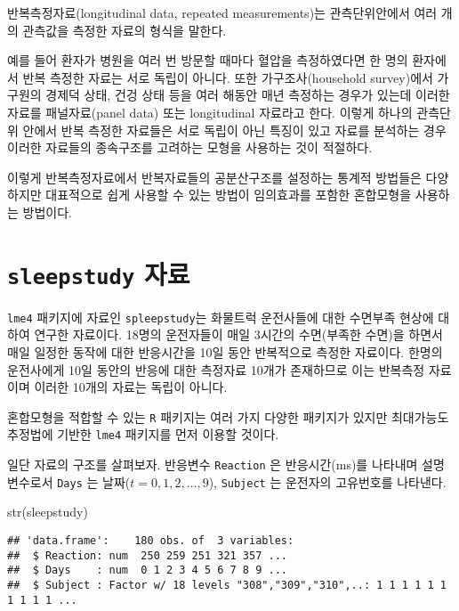\documentclass[
]{book}
\newenvironment{Shaded}{\begin{snugshade}}{\end{snugshade}}
\newcommand{\FunctionTok}[1]{\textcolor[rgb]{0.00,0.00,0.00}{#1}}
\newcommand{\NormalTok}[1]{#1}
\begin{document}
반복측정자료(longitudinal data, repeated measurements)는 관측단위안에서 여러 개의 관측값을 측정한 자료의 형식을 말한다.

예를 들어 환자가 병원을 여러 번 방문할 때마다 혈압을 측정하였다면 한 명의 환자에서 반복 측정한 자료는 서로 독립이 아니다. 또한 가구조사(household survey)에서 가구원의 경제덕 상태, 건겅 상태 등을 여러 해동안 매년 측정하는 경우가 있는데 이러한 자료를 패널자료(panel data) 또는 longitudinal 자료라고 한다. 이렇게 하나의 관측단위 안에서 반복 측정한 자료들은 서로 독립이 아닌 특징이 있고 자료를 분석하는 경우 이러한 자료들의 종속구조를 고려하는 모형을 사용하는 것이 적절하다.

이렇게 반복측정자료에서 반복자료들의 공분산구조를 설정하는 통계적 방법들은 다양하지만 대표적으로 쉽게 사용할 수 있는 방법이 임의효과를 포함한 혼합모형을 사용하는 방법이다.

\hypertarget{sleepstudy-uxc790uxb8cc}{%
\section{\texorpdfstring{\texttt{sleepstudy} 자료}{sleepstudy 자료}}\label{sleepstudy-uxc790uxb8cc}}

\texttt{lme4} 패키지에 자료인 \texttt{spleepstudy}는 화물트럭 운전사들에 대한 수면부족 현상에 대하여 연구한 자료이다. 18명의 운전자들이 매일 3시간의 수면(부족한 수면)을 하면서
매일 일정한 동작에 대한 반응시간을 10일 동안 반복적으로 측정한 자료이다.
한명의 운전사에게 10일 동안의 반응에 대한 측정자료 10개가 존재하므로 이는 반복측정 자료이며 이러한 10개의 자료는 독립이 아니다.

혼합모형을 적합할 수 있는 \texttt{R} 패키지는 여러 가지 다양한 패키지가 있지만 최대가능도 추정법에 기반한
\texttt{lme4} 패키지를 먼저 이용할 것이다.

일단 자료의 구조를 살펴보자. 반응변수 \texttt{Reaction} 은 반응시간(ms)를 나타내며 설명변수로서 \texttt{Days} 는 날짜(\(t=0,1,2,\dots,9\)), \texttt{Subject} 는 운전자의 고유번호를 나타낸다.

\begin{Shaded}
\begin{Highlighting}[]
\FunctionTok{str}\NormalTok{(sleepstudy)}
\end{Highlighting}
\end{Shaded}

\begin{verbatim}
## 'data.frame':    180 obs. of  3 variables:
##  $ Reaction: num  250 259 251 321 357 ...
##  $ Days    : num  0 1 2 3 4 5 6 7 8 9 ...
##  $ Subject : Factor w/ 18 levels "308","309","310",..: 1 1 1 1 1 1 1 1 1 1 ...
\end{verbatim}
\end{document}
